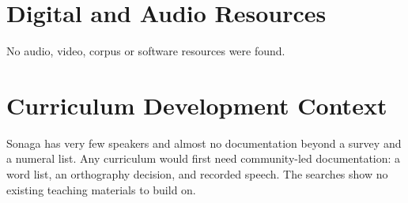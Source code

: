 \documentclass[12pt]{article}
\begin{document}
\section{Digital and Audio Resources}
No audio, video, corpus or software resources were found.

\section{Curriculum Development Context}
Sonaga has very few speakers and almost no documentation beyond a survey and a numeral list. Any curriculum would first need community-led documentation: a word list, an orthography decision, and recorded speech. The searches show no existing teaching materials to build on.
\end{document}
